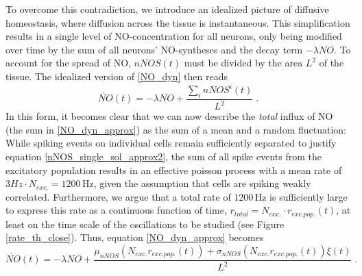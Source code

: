 \documentclass[10pt,a4paper]{article}
\begin{document}
To overcome this contradiction, we introduce an idealized picture of diffusive homeostasis, where diffusion across the tissue is instantaneous. This simplification results in a single level of NO-concentration for all neurons, only being modified over time by the sum of all neurons' NO-syntheses and the decay term $-\lambda NO$. To account for the spread of NO, $nNOS(t)$ must be divided by the area $L^2$ of the tissue. The idealized version of \eqref{NO_dyn} then reads
\begin{equation}
\dot{NO}(t)=-\lambda NO + \frac{\sum_{i} nNOS^i(t)}{L^2}\;.
\label{NO_dyn_approx}
\end{equation}
In this form, it becomes clear that we can now describe the \emph{total} influx of NO (the sum in \eqref{NO_dyn_approx}) as the sum of a mean and a random fluctuation: While spiking events on individual cells remain sufficiently separated to justify equation \eqref{nNOS_single_sol_approx2}, the sum of all spike events from the excitatory population results in an effective poisson process with a mean rate of $3 Hz \cdot N_{exc.} = \mathrm{1200\,Hz}$, given the assumption that cells are spiking weakly correlated. Furthermore, we argue that a total rate of $\mathrm{1200\,Hz}$ is sufficiently large to express this rate as a continuous function of time, $r_{total} = N_{exc.}\cdot r_{exc.pop.}(t)$, at least on the time scale of the oscillations to be studied (see  Figure \ref{rate_th_close}). Thus, equation \eqref{NO_dyn_approx} becomes
\begin{equation}
\dot{NO}(t)=-\lambda NO + \frac{\mu_{nNOS}(N_{exc.}r_{exc.pop.}(t)) + \sigma_{nNOS}(N_{exc.}r_{exc.pop.}(t)) \xi (t)}{L^2}\;.
\label{NO_dyn_approx2}
\end{equation}
\end{document}
